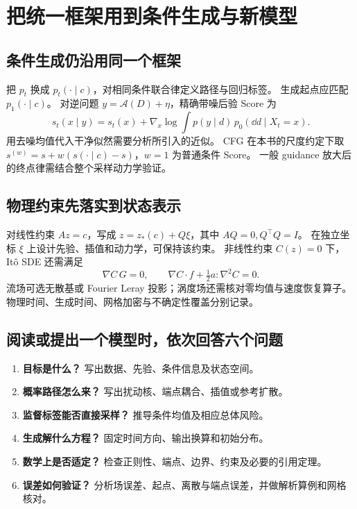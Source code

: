 \documentclass[language=chinese,margin=right,11pt]{lumenbook}
\begin{document}
\clearpage
\section*{把统一框架用到条件生成与新模型}

\subsection*{条件生成仍沿用同一个框架}
把 \(p_t\) 换成 \(p_t(\cdot\mid c)\)，对相同条件联合律定义路径与回归标签。
生成起点应匹配 \(p_1(\cdot\mid c)\)。
对逆问题 \(y=\mathcal A(D)+\eta\)，精确带噪后验 Score 为
\[
 s_t(x\mid y)=s_t(x)+\nabla_x\log\int p(y\mid d)\,p_0(\dd d\mid X_t=x).
\]
用去噪均值代入干净似然需要分析所引入的近似。
CFG 在本书的尺度约定下取
\(s^{(w)}=s+w(s(\cdot\mid c)-s)\)，\(w=1\) 为普通条件 Score。
一般 guidance 放大后的终点律需结合整个采样动力学验证。

\subsection*{物理约束先落实到状态表示}
对线性约束 \(Az=c\)，写成 \(z=z_*(c)+Q\xi\)，其中 \(AQ=0,Q^\top Q=I\)。
在独立坐标 \(\xi\) 上设计先验、插值和动力学，可保持该约束。
非线性约束 \(C(z)=0\) 下，It\^o SDE 还需满足
\[
 \nabla C\,G=0,\qquad \nabla C\cdot f+\tfrac12a:\nabla^2C=0.
\]
流场可选无散基或 Fourier Leray 投影；涡度场还需核对零均值与速度恢复算子。
物理时间、生成时间、网格加密与不确定性覆盖分别记录。

\subsection*{阅读或提出一个模型时，依次回答六个问题}
\begin{enumerate}
 \item \textbf{目标是什么？} 写出数据、先验、条件信息及状态空间。
 \item \textbf{概率路径怎么来？} 写出扰动核、端点耦合、插值或参考扩散。
 \item \textbf{监督标签能否直接采样？} 推导条件均值及相应总体风险。
 \item \textbf{生成解什么方程？} 固定时间方向、输出换算和初始分布。
 \item \textbf{数学上是否适定？} 检查正则性、端点、边界、约束及必要的引用定理。
 \item \textbf{误差如何验证？} 分析场误差、起点、离散与端点误差，并做解析算例和网格核对。
\end{enumerate}
\end{document}
